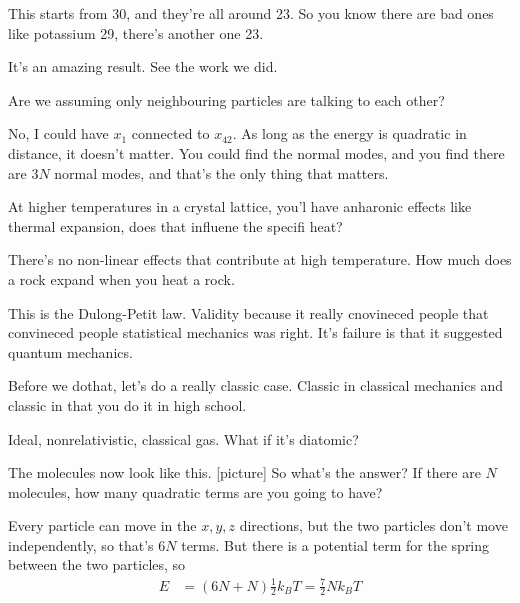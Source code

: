 This starts from 30,
and they're all around 23.
So you know there are bad ones like potassium 29,
there's another one 23.

It's an amazing result.
See the work we did.

\begin{question}
    Are we assuming only neighbouring particles are talking to each other?
\end{question}
No, I could have $x_1$ connected to $x_{42}$.
As long as the energy is quadratic in distance,
it doesn't matter.
You could find the normal modes,
and you find there are $3N$ normal modes,
and that's the only thing that matters.

\begin{question}
    At higher temperatures in a crystal lattice,
    you'l have anharonic effects 
    like thermal expansion,
    does that influene the specifi heat?
\end{question}
There's no non-linear effects that contribute at high temperature.
How much does a rock expand when you heat a rock.

This is the Dulong-Petit law.
Validity because it really cnovineced people that convineced people statistical
mechanics was right.
It's failure is that it suggested quantum mechanics.

Before we dothat,
let's do a really classic case.
Classic in classical mechanics and classic in that you do it in high school.

\begin{example}
    Ideal, nonrelativistic, classical gas.
    What if it's diatomic?
\end{example}
The molecules now look like this.
[picture]
So what's the answer?
If there are $N$ molecules,
how many quadratic terms are you going to have?

Every particle can move in the $x,y,z$ directions,
but the two particles don't move independently,
so that's $6N$ terms.
But there is a potential term for the spring between the two particles,
so
\begin{align}
    E &= (6N + N)\frac{1}{2}k_B T = \frac{7}{2}Nk_B T
\end{align}
